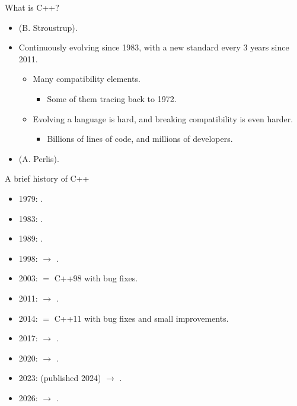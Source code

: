 \begin{frame}[t,fragile]{What is C++?}
\begin{itemize}
  \item {} (B. Stroustrup).
  
  \item Continuously evolving since 1983, with a new standard every 3 years since 2011.
    \begin{itemize}
      \item Many compatibility elements.
        \begin{itemize}
          \item Some of them tracing back to 1972.
        \end{itemize}
      \item Evolving a language is hard, and breaking compatibility is even harder.
        \begin{itemize}
          \item Billions of lines of code, and millions of developers.
        \end{itemize}
    \end{itemize}

    \item {} (A. Perlis).
\end{itemize}
\end{frame}


\begin{frame}[t,fragile]{A brief history of C++}
\begin{itemize}
  \item 1979: .
  \item 1983: .
  \item 1989: .
  \item 1998:  $\rightarrow$ .
  \item 2003:  $=$ C++98 with bug fixes.
  \item 2011:  $\rightarrow$ .
  \item 2014:  $=$ C++11 with bug fixes and small improvements.
  \item 2017:  $\rightarrow$ .
  \item 2020:  $\rightarrow$ .
  \item 2023:  (published 2024) $\rightarrow$ .
  \item 2026:  $\rightarrow$ .
\end{itemize}
\end{frame}

